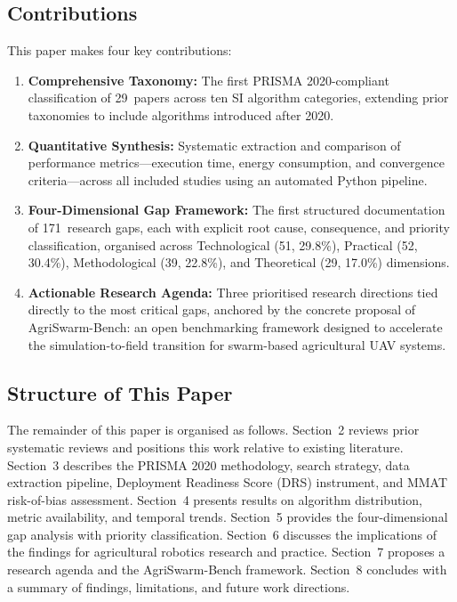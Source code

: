 \documentclass[review,3p]{elsarticle}
\begin{document}
\subsection{Contributions}

This paper makes four key contributions:

\begin{enumerate}
    \item \textbf{Comprehensive Taxonomy:} The first PRISMA 2020-compliant
    classification of 29~papers across ten SI algorithm categories, extending
    prior taxonomies \cite{chung2018,brambilla2013,puente2022,sharma2022} to
    include algorithms introduced after 2020.
    \item \textbf{Quantitative Synthesis:} Systematic extraction and comparison
    of performance metrics---execution time, energy consumption, and convergence
    criteria---across all included studies using an automated Python pipeline.
    \item \textbf{Four-Dimensional Gap Framework:} The first structured
    documentation of 171~research gaps, each with explicit root cause,
    consequence, and priority classification, organised across Technological
    (51, 29.8\%), Practical (52, 30.4\%), Methodological (39, 22.8\%), and
    Theoretical (29, 17.0\%) dimensions.
    \item \textbf{Actionable Research Agenda:} Three prioritised research
    directions tied directly to the most critical gaps, anchored by the concrete
    proposal of AgriSwarm-Bench: an open benchmarking framework designed to
    accelerate the simulation-to-field transition for swarm-based agricultural
    UAV systems.
\end{enumerate}

\subsection{Structure of This Paper}

The remainder of this paper is organised as follows. Section~2 reviews prior
systematic reviews and positions this work relative to existing literature.
Section~3 describes the PRISMA 2020 methodology, search strategy, data
extraction pipeline, Deployment Readiness Score (DRS) instrument, and MMAT
risk-of-bias assessment. Section~4 presents results on algorithm distribution,
metric availability, and temporal trends. Section~5 provides the
four-dimensional gap analysis with priority classification. Section~6 discusses
the implications of the findings for agricultural robotics research and
practice. Section~7 proposes a research agenda and the AgriSwarm-Bench
framework. Section~8 concludes with a summary of findings, limitations, and
future work directions.
\end{document}
